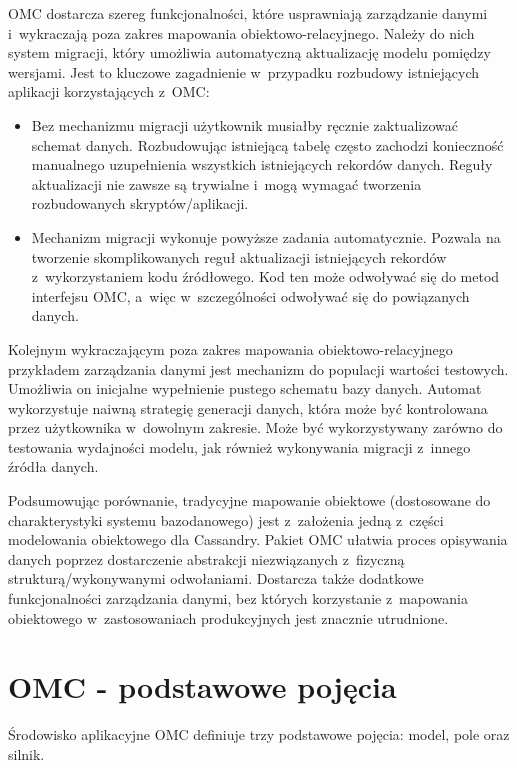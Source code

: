 OMC dostarcza szereg funkcjonalności, które usprawniają zarządzanie danymi i~wykraczają poza zakres mapowania obiektowo-relacyjnego. Należy do nich system migracji, który umożliwia automatyczną aktualizację modelu pomiędzy wersjami. Jest to kluczowe zagadnienie w~przypadku rozbudowy istniejących aplikacji korzystających z~OMC:

\begin{itemize}
	\item Bez mechanizmu migracji użytkownik musiałby ręcznie zaktualizować schemat danych. Rozbudowując istniejącą tabelę często zachodzi konieczność manualnego uzupełnienia wszystkich istniejących rekordów danych. Reguły aktualizacji nie zawsze są trywialne i~mogą wymagać tworzenia rozbudowanych skryptów/aplikacji.
	\item Mechanizm migracji wykonuje powyższe zadania automatycznie. Pozwala na tworzenie skomplikowanych reguł aktualizacji istniejących rekordów z~wykorzystaniem kodu źródłowego. Kod ten może odwoływać się do metod interfejsu OMC, a~więc w~szczególności odwoływać się do powiązanych danych.
\end{itemize}

Kolejnym wykraczającym poza zakres mapowania obiektowo-relacyjnego przykładem zarządzania danymi jest mechanizm do populacji wartości testowych. Umożliwia on inicjalne wypełnienie pustego schematu bazy danych. Automat wykorzystuje naiwną strategię generacji danych, która może być kontrolowana przez użytkownika w~dowolnym zakresie. Może być wykorzystywany zarówno do testowania wydajności modelu, jak również wykonywania migracji z~innego źródła danych.

Podsumowując porównanie, tradycyjne mapowanie obiektowe (dostosowane do charakterystyki systemu bazodanowego) jest z~założenia jedną z~części modelowania obiektowego dla Cassandry. Pakiet OMC ułatwia proces opisywania danych poprzez dostarczenie abstrakcji niezwiązanych z~fizyczną strukturą/wykonywanymi odwołaniami. Dostarcza także dodatkowe funkcjonalności zarządzania danymi, bez których korzystanie z~mapowania obiektowego w~zastosowaniach produkcyjnych jest znacznie utrudnione. 

\section{OMC - podstawowe pojęcia}
\label{sec:ocm_basics}

Środowisko aplikacyjne OMC definiuje trzy podstawowe pojęcia: model, pole oraz silnik.

